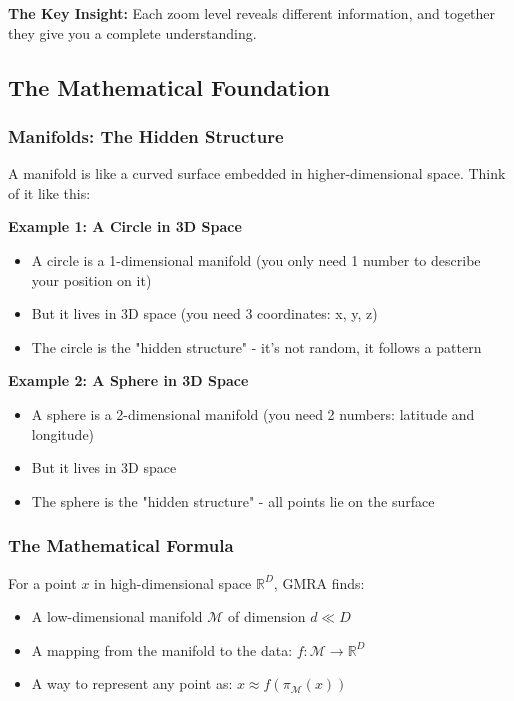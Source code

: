 \documentclass[12pt]{article}
\begin{document}
\textbf{The Key Insight:} Each zoom level reveals different information, and together they give you a complete understanding.

\subsection{The Mathematical Foundation}

\subsubsection{Manifolds: The Hidden Structure}

A manifold is like a curved surface embedded in higher-dimensional space. Think of it like this:

\textbf{Example 1: A Circle in 3D Space}
\begin{itemize}
    \item A circle is a 1-dimensional manifold (you only need 1 number to describe your position on it)
    \item But it lives in 3D space (you need 3 coordinates: x, y, z)
    \item The circle is the "hidden structure" - it's not random, it follows a pattern
\end{itemize}

\textbf{Example 2: A Sphere in 3D Space}
\begin{itemize}
    \item A sphere is a 2-dimensional manifold (you need 2 numbers: latitude and longitude)
    \item But it lives in 3D space
    \item The sphere is the "hidden structure" - all points lie on the surface
\end{itemize}

\subsubsection{The Mathematical Formula}

For a point $x$ in high-dimensional space $\mathbb{R}^D$, GMRA finds:
\begin{itemize}
    \item A low-dimensional manifold $\mathcal{M}$ of dimension $d \ll D$
    \item A mapping from the manifold to the data: $f: \mathcal{M} \rightarrow \mathbb{R}^D$
    \item A way to represent any point as: $x \approx f(\pi_{\mathcal{M}}(x))$
\end{itemize}
\end{document}
